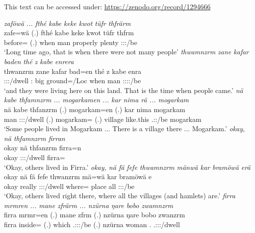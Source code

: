 \noindent
This text can be accessed under: \href{https://zenodo.org/record/1294666}{https://zenodo.org/record/1294666}

\clearpage
\begin{exe}
	\emph{zaföwä ... fthé kabe keke kwot tüfr thfrärm}\\
	\gll zafe=wä (.) fthé kabe keke kwot tüfr thfrm\\
	before=\Emph{} (.) when man \Neg{} properly plenty \Stpl:\Sbj:\Pst:\Dur/be\\
	\trans `Long time ago, that is when there were not many people'
	\emph{thwamnzrm zane kafar baden thé z kabe enrera}\\
	\gll thwanzrm zane kafar bad=en thé z kabe enra\\
	\Stpl:\Sbj:\Pst:\Dur/dwell \Dem:\Prox{} big ground=/Loc{} when \Iam{} man \Stpl:\Sbj:\Pst:\Ipfv:\Venit/be\\
	\trans `and they were living here on this land. That is the time when people came.'
	\emph{nä kabe thfamnzrm ... mogarkamen ... kar nima rä ... mogarkam}\\
	\gll nä kabe thfanzrm (.) mogarkam=en (.) kar nima  mogarkam\\
	\Indf{} man \Stpl:\Sbj:\Pst:\Dur/dwell (.) mogarkam=\Loc{} (.) village {like.this} \Tsg.\F:\Nonpast:\Ipfv/be mogarkam\\
	\trans `Some people lived in Mogarkam ... There is a village there ... Mogarkam.'
	\emph{okay, nä thfamnzrm firran}\\
	\gll okay nä thfanzrm firra=n\\
	okay \Indf{} \Stpl:\Sbj:\Pst:\Dur/dwell firra=\Loc{}\\
	\trans `Okay, others lived in Firra.'
	\emph{okay, nä fä fefe thwamnzrm mänwä kar bramöwä erä}\\
	\gll okay nä fä fefe thwanzrm mä=wä kar bramöwä e\\
	okay \Indf{} \Dist{} really \Stpl:\Sbj:\Pst:\Dur/dwell where=\Emph{} place all \Stpl:\Sbj:\Nonpast:\Ipfv/be\\
	\trans `Okay, others lived right there, where all the villages (and hamlets) are.'
	\emph{firra mrmren ... mane zfrärm ... nzürna ŋare bobo zwamnzrm}\\
	\gll firra mrmr=en (.) mane zfrm (.) nzürna ŋare bobo zwanzrm\\
	firra inside=\Loc{} (.) which \Tsg.\F:\Sbj:\Pst:\Dur/be (.) nzürna woman \Med.\Abl{} \Tsg.\F:\Sbj:\Pst:\Dur/dwell\\

\end{exe}
